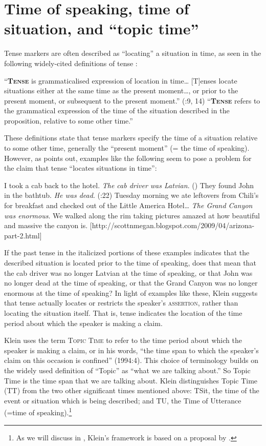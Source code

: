 \section{Time of speaking, time of situation, and “topic time”}\label{sec:20.3}

Tense markers are often described as “locating” a situation in time, as seen in the following widely-cited definitions of tense :


\ea \label{ex:20.10}
\ea   “\textbf{\textsc{Tense}} is grammaticalised expression of location in time… [T]enses locate situations either at the same time as the present moment…, or prior to the present moment, or subsequent to the present moment.” (\citealt{Comrie1985}:9, 14)
\ex  “\textbf{\textsc{Tense}} refers to the grammatical expression of the time of the situation described in the proposition, relative to some other time.” \citep{Bybee1985}
\z \z


These definitions state that tense markers specify the time of a situation relative to some other time, generally the “present moment” (= the time of speaking). However, as \citet{Klein1994} points out, examples like the following seem to pose a problem for the claim that tense “locates situations in time”:


\ea \label{ex:20.11}
\ea   I took a cab back to the hotel. \textit{The cab driver was Latvian}. (\citealt{Michaelis2006})
\ex They found John in the bathtub. \textit{He was dead}.  (\citealt{Klein1994}:22)
\ex  Tuesday morning we ate leftovers from Chili’s for breakfast and checked out of the Little America Hotel… \textit{The Grand Canyon was enormous}. We walked along the rim taking pictures amazed at how beautiful and massive the canyon is. [http://scottnmegan.blogspot.com/2009/04/arizona-part-2.html]
\z \z


If the past tense in the italicized portions of these examples indicates that the described situation is located prior to the time of speaking, does that mean that the cab driver was no longer Latvian at the time of speaking, or that John was no longer dead at the time of speaking, or that the Grand Canyon was no longer enormous at the time of speaking? In light of examples like these, Klein suggests that tense actually locates or restricts the speaker’s \textsc{assertion}, rather than locating the situation itself. That is, tense indicates the location of the time period about which the speaker is making a claim.



Klein uses the term \textsc{Topic Time} to refer to the time period about which the speaker is making a claim, or in his words, “the time span to which the speaker’s claim on this occasion is confined” (1994:4). This choice of terminology builds on the widely used definition of “Topic” as “what we are talking about.” So Topic Time is the time span that we are talking about. Klein distinguishes Topic Time (TT) from the two other significant times mentioned above: TSit, the time of the event or situation which is being described; and TU, the Time of Utterance (=time of speaking).\footnote{As we will discuss in , Klein’s framework is based on a proposal by \citet[§51]{Reichenbach1947}.}



